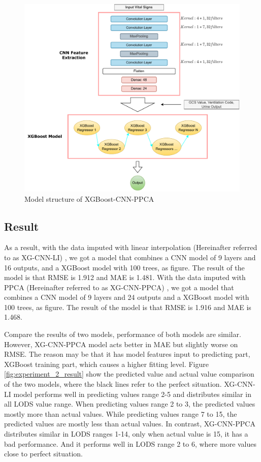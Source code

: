 \documentclass[12pt,a4paper,english
]{tunithesis}
\begin{document}
\begin{figure}
  \begin{center}
    \includegraphics[width=1\textwidth]{thesis/img/xg_cnn_ppca.pdf}
  \end{center}
  \caption[XGBoost-CNN-PPCA model]{Model structure of XGBoost-CNN-PPCA}
  \label{fig:xg_cnn_ppca_struc}
\end{figure}

\subsection{Result}
As a result, with the data imputed with linear interpolation (Hereinafter referred to as XG-CNN-LI) , we got a model that combines a CNN model of 9 layers and 16 outputs, and a XGBoost model with 100 trees, as figure. The result of the model is that RMSE is 1.912 and MAE is 1.481. With the data imputed with PPCA (Hereinafter referred to as XG-CNN-PPCA) , we got a model that combines a CNN model of 9 layers and 24 outputs and a XGBoost model with 100 trees, as figure. The result of the model is that RMSE is 1.916 and MAE is 1.468.

Compare the results of two models, performance of both models are similar. However, XG-CNN-PPCA model acts better in MAE but slightly worse on RMSE. The reason may be that it has model features input to predicting part, XGBoost training part, which causes a higher fitting level. Figure \ref{fig:experiment_2_result} show the predicted value and actual value comparison of the two models, where the black lines refer to the perfect situation. XG-CNN-LI model performs well in predicting values range 2-5 and distributes similar in all LODS value range. When predicting values range 2 to 3, the predicted values mostly more than actual values. While predicting values range 7 to 15, the predicted values are mostly less than actual values. In contrast, XG-CNN-PPCA distributes similar in LODS ranges 1-14, only when actual value is 15, it has a bad performance. And it performs well in LODS range 2 to 6, where more values close to perfect situation.
\end{document}
